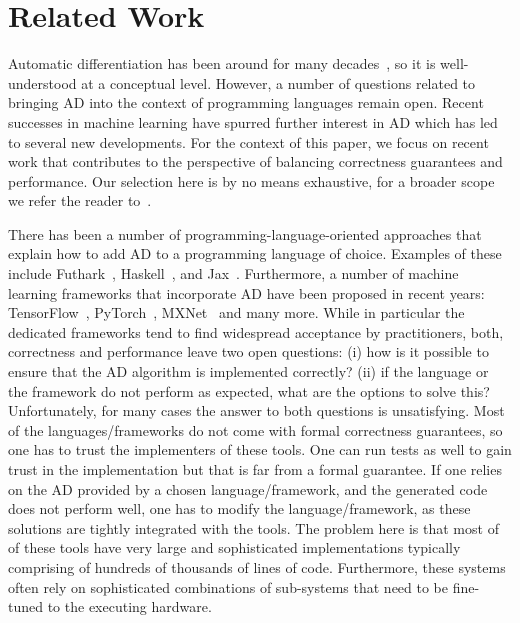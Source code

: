 \section{Related Work\label{sec:relatedwork}}


Automatic differentiation has been around for many decades~\cite{early-ad1, early-ad2},
so it is well-understood at a conceptual level.  However,
a number of questions related to bringing AD into the context of
programming languages remain open.  Recent successes in machine learning
have spurred further interest in AD which has led to several new developments.
For the context of this paper, we focus on recent work that contributes to 
the perspective of balancing correctness guarantees and performance.
Our selection here is by no means exhaustive, for
a broader scope we refer the reader to~\cite{autodiff-survey}.

There has been a number of programming-language-oriented approaches that explain
how to add AD to a programming language of choice. Examples of these include
Futhark~\cite{futhark/sc22ad}, Haskell~\cite{ad-haskell}, and
Jax~\cite{ad-jax}. Furthermore, a number of machine learning
frameworks that incorporate AD have been proposed in recent years: TensorFlow~\cite{ad-tf},
PyTorch~\cite{ad-pytorch}, MXNet~\cite{ad-mxnet} and many more.
While in particular the dedicated frameworks tend to find widespread 
acceptance by practitioners, both, correctness and performance leave
two open questions: (i) how is it possible to
ensure that the AD algorithm is implemented correctly? (ii) if the
language or the framework do not perform as expected, what are the
options to solve this?  Unfortunately, for many cases the answer to
both questions is unsatisfying.  Most of the languages/frameworks do not
come with formal correctness guarantees, so one has to trust the
implementers of these tools.  One can run tests as well to gain trust 
in the implementation but that is far from a 
formal guarantee.  If one relies
on the AD provided by a chosen language/framework, and the generated code does not
perform well, one has to modify the language/framework, as these solutions
are tightly integrated with the tools. The problem here is that most of of these tools
have very large and sophisticated implementations typically comprising
of hundreds of thousands of lines of code.  Furthermore, these systems
often rely on sophisticated 
combinations of sub-systems that need to be fine-tuned to the executing hardware.

